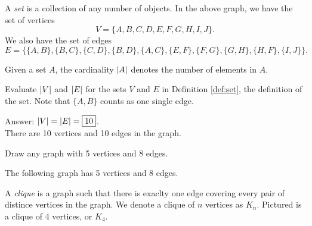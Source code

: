 \documentclass[11pt]{article}
\begin{document}
\begin{definition}
\label{def:set}
A \textit{set} is a collection of any number of objects. In the above graph, we have the set of vertices
\[V=\{A, B, C, D, E, F, G, H, I, J\}.\]
We also have the set of edges
\[E=\{\{A,B\}, \{B,C\}, \{C,D\},\{B,D\},\{A,C\},\{E,F\},\{F,G\},\{G,H\},\{H,F\},\{I,J\} \}.\]
\end{definition}

\begin{definition}
\label{def:cardinality}
Given a set $A$, the cardinality $\left\lvert A \right\rvert$ denotes the number of elements in $A$.
\end{definition}

\begin{problem} %
Evaluate $\left\lvert V \right\rvert$ and $\left\lvert E \right\rvert$ for the sets $V$ and $E$ in Definition \ref{def:set}, the definition of the set.
Note that $\{A,B\}$ counts as one single edge.
\end{problem}

\begin{solution}
Answer: $\left\lvert V \right\rvert = \left\lvert E \right\rvert = \boxed{10}$. \\
There are 10 vertices and 10 edges in the graph.
\end{solution}

\begin{problem} %
Draw any graph with 5 vertices and 8 edges.
\end{problem}

\begin{solution}
The following graph has 5 vertices and 8 edges.
\begin{center}
\end{center}
\end{solution}

\begin{definition}
\label{def:clique}
A \textit{clique} is a graph such that there is exaclty one edge covering every pair of distince vertices in the graph.
We denote a clique of $n$ vertices as $K_n$.
Pictured is a clique of 4 vertices, or $K_4$.
\begin{center}
\end{center}
\end{definition}
\end{document}
